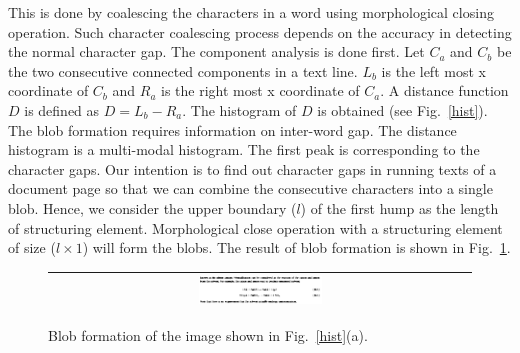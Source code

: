 \documentclass[conference]{IEEEtran}
\begin{document}
This is done by coalescing the characters in a word using morphological closing operation. Such character coalescing process depends on the accuracy in detecting the normal character gap. The component analysis is done first. Let $C_a$ and $C_b$ be the two consecutive connected
components in a text line. $L_b$ is the left most x coordinate of $C_b$ and $R_a$ is the right most x coordinate of $C_a$. A distance function $D$ is defined as  $D = L_b - R_a$. The histogram of $D$ is obtained (see Fig.~\ref{hist}). The blob
formation requires information on inter-word gap. The distance histogram is a multi-modal histogram. The first peak is
corresponding to the character gaps. Our intention is to find out character gaps in running texts of a document page so that
we can combine the consecutive characters into a single blob. Hence, we consider the upper boundary ($l$) of the first hump as
the length of structuring element. Morphological close operation with a structuring element of size ($l\times 1$) will form the
blobs. The result of blob formation is shown in Fig.~\ref{BLOB_FORM}. 
\begin{figure}[h]
\center\footnotesize
\begin{tabular}{|c|} 
\hline
\includegraphics[width=0.3\textwidth]{blob.png}\\
\hline
\end{tabular}
\caption{Blob formation of the image shown in Fig.~\ref{hist}(a). } 
\label{BLOB_FORM} 
\end{figure}
\end{document}
